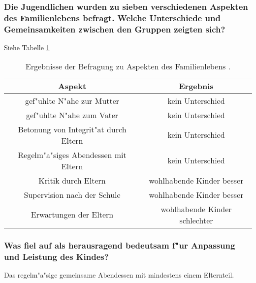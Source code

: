\subsubsection{Die Jugendlichen wurden zu sieben verschiedenen Aspekten des Familienlebens befragt. Welche Unterschiede und Gemeinsamkeiten zwischen den Gruppen zeigten sich?}
Siehe Tabelle \ref{tab:familyaspects}
\begin{table}[hb!]
        \centering
        \begin{tabular}{c | c}
                \hline
                Aspekt & Ergebnis\\
                \hline
                gef"uhlte N"ahe zur Mutter & kein Unterschied\\
                gef"uhlte N"ahe zum Vater & kein Unterschied\\
                Betonung von Integrit"at durch Eltern & kein Unterschied\\
                Regelm"a"siges Abendessen mit Eltern & kein Unterschied\\
                \hline
                Kritik durch Eltern & wohlhabende Kinder besser\\
                Supervision nach der Schule & wohlhabende Kinder besser\\
                \hline
                Erwartungen der Eltern & wohlhabende Kinder schlechter\\
                \hline
        \end{tabular}
        \caption{Ergebnisse der Befragung zu Aspekten des Familienlebens \parencite{luthar_children_2005}.}
        \label{tab:familyaspects}
\end{table}

\subsubsection{Was fiel auf als herausragend bedeutsam f"ur Anpassung und Leistung des Kindes?}
Das regelm"a"sige gemeinsame Abendessen mit mindestens einem Elternteil.

